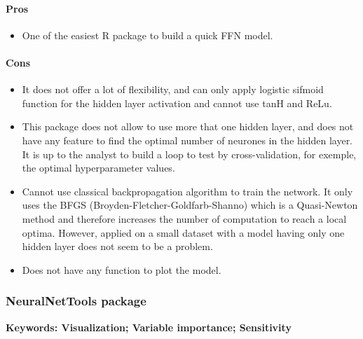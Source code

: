 \documentclass[6pt,letter]{article}\usepackage[]{graphicx}\usepackage[]{color}
\begin{document}
\paragraph{Pros}
\begin{itemize}
\item One of the easiest R package to build a quick FFN model.
\end{itemize}
\paragraph{Cons}
\begin{itemize}
\item It does not offer a lot of flexibility, and can only apply logistic sifmoid function for the hidden layer activation and cannot use tanH and ReLu.
\item This package does not allow to use more that one hidden layer, and does not have any feature to find the optimal number of neurones in the hidden layer. It is up to the analyst to build a loop to test by cross-validation, for exemple, the optimal hyperparameter values.
\item Cannot use classical backpropagation algorithm to train the network. It only uses the BFGS (Broyden-Fletcher-Goldfarb-Shanno) which is a Quasi-Newton method and therefore increases the number of computation to reach a local optima. However, applied on a small dataset with a model having only one hidden layer does not seem to be a problem.
\item Does not have any function to plot the model.
\end{itemize}


\subsubsection{NeuralNetTools package}
\textbf{Keywords: Visualization; Variable importance; Sensitivity}
\end{document}
